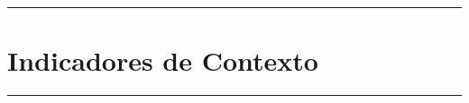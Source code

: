 
  \thispagestyle{empty}


    \begin{minipage}{0.85\textwidth}
    \end{minipage}%

    \vspace{14cm}
    \begin{minipage}{0.85\textwidth}
      \begin{center}
          \sffamily
          
          \rule{\textwidth}{0.2mm}
          \chapter{Indicadores de Contexto}
          \rule{\textwidth}{0.2mm}\\
      \end{center}
    \end{minipage}%
    

